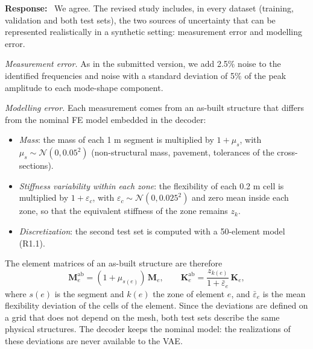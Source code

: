 \documentclass[11pt]{article}
\newenvironment{response}{\par\smallskip\noindent\color{resp}\textbf{Response:}\ }{\par}
\begin{document}
\begin{response}
We agree. The revised study includes, in every dataset (training, validation and both test sets), the two sources of
uncertainty that can be represented realistically in a synthetic setting: measurement error and modelling error.

\textit{Measurement error.} As in the submitted version, we add 2.5\% noise to the identified frequencies and noise with
a standard deviation of 5\% of the peak amplitude to each mode-shape component.

\textit{Modelling error.} Each measurement comes from an as-built structure that differs from the nominal FE model
embedded in the decoder:
\begin{itemize}[leftmargin=*]
\item \emph{Mass}: the mass of each 1 m segment is multiplied by $1+\mu_s$, with $\mu_s\sim\mathcal{N}(0,0.05^2)$
(non-structural mass, pavement, tolerances of the cross-sections).
\item \emph{Stiffness variability within each zone}: the flexibility of each 0.2 m cell is multiplied by
$1+\varepsilon_c$, with $\varepsilon_c\sim\mathcal{N}(0,0.025^2)$ and zero mean inside each zone, so that the
equivalent stiffness of the zone remains $z_k$.
\item \emph{Discretization}: the second test set is computed with a 50-element model (R1.1).
\end{itemize}
The element matrices of an as-built structure are therefore
\begin{equation}
\mathbf{M}_e^{\mathrm{ab}}=(1+\mu_{s(e)})\,\mathbf{M}_e,\qquad
\mathbf{K}_e^{\mathrm{ab}}=\frac{z_{k(e)}}{1+\bar{\varepsilon}_e}\,\mathbf{K}_e ,
\label{eq:asbuilt}
\end{equation}
where $s(e)$ is the segment and $k(e)$ the zone of element $e$, and $\bar{\varepsilon}_e$ is the mean flexibility
deviation of the cells of the element. Since the deviations are defined on a grid that does not depend on the mesh,
both test sets describe the same physical structures. The decoder keeps the nominal model: the realizations of these
deviations are never available to the VAE.


\end{response}
\end{document}
